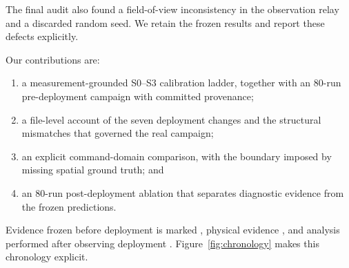 The final audit also found a field-of-view inconsistency in the
observation relay and a discarded random seed. We retain the frozen
results and report these defects explicitly.

Our contributions are:

\begin{enumerate}
\item a measurement-grounded S0--S3 calibration ladder, together with an
  80-run pre-deployment campaign with committed provenance;
\item a file-level account of the seven deployment changes and the
  structural mismatches that governed the real campaign;
\item an explicit command-domain comparison, with the boundary imposed
  by missing spatial ground truth; and
\item an 80-run post-deployment ablation that separates diagnostic
  evidence from the frozen predictions.
\end{enumerate}

Evidence frozen before deployment is marked \frozenmark, physical
evidence \realmark, and analysis performed after observing deployment
\diagmark. Figure~\ref{fig:chronology} makes this chronology explicit.



